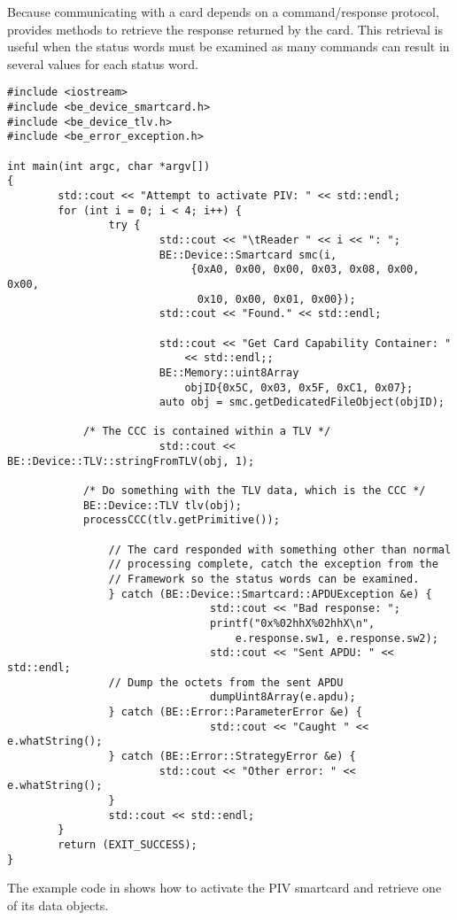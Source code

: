 Because communicating with a card depends on a command/response protocol,
 provides methods to retrieve the response returned by the
card. This retrieval is useful when the status words must be examined as many
commands can result in several values for each status word.

\newpage

\begin{lstlisting}[caption={Accessing a PIV smartcard}, label=lst:smc-example]
#include <iostream>
#include <be_device_smartcard.h>
#include <be_device_tlv.h>
#include <be_error_exception.h>

int main(int argc, char *argv[])
{
        std::cout << "Attempt to activate PIV: " << std::endl;
        for (int i = 0; i < 4; i++) {
                try {
                        std::cout << "\tReader " << i << ": ";
                        BE::Device::Smartcard smc(i,
                             {0xA0, 0x00, 0x00, 0x03, 0x08, 0x00, 0x00,
                              0x10, 0x00, 0x01, 0x00});
                        std::cout << "Found." << std::endl;

                        std::cout << "Get Card Capability Container: "
                            << std::endl;;
                        BE::Memory::uint8Array
                            objID{0x5C, 0x03, 0x5F, 0xC1, 0x07};
                        auto obj = smc.getDedicatedFileObject(objID);

			/* The CCC is contained within a TLV */
                        std::cout << BE::Device::TLV::stringFromTLV(obj, 1);

			/* Do something with the TLV data, which is the CCC */
			BE::Device::TLV tlv(obj);
			processCCC(tlv.getPrimitive());

                // The card responded with something other than normal
                // processing complete, catch the exception from the
                // Framework so the status words can be examined.
                } catch (BE::Device::Smartcard::APDUException &e) {
                                std::cout << "Bad response: ";
                                printf("0x%02hhX%02hhX\n",
                                    e.response.sw1, e.response.sw2);
                                std::cout << "Sent APDU: " << std::endl;
				// Dump the octets from the sent APDU
                                dumpUint8Array(e.apdu);
                } catch (BE::Error::ParameterError &e) {
                                std::cout << "Caught " << e.whatString();
                } catch (BE::Error::StrategyError &e) {
                        std::cout << "Other error: " << e.whatString();
                }
                std::cout << std::endl;
        }
        return (EXIT_SUCCESS);
}
\end{lstlisting}

The example code in  shows how to activate the PIV
smartcard and retrieve one of its data objects.

